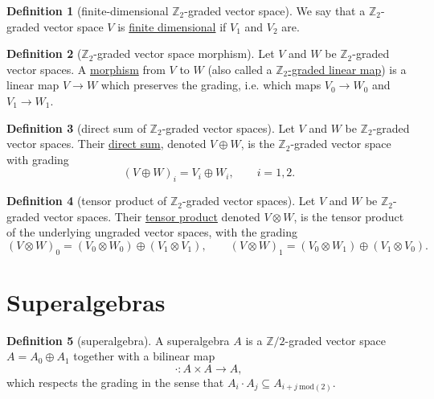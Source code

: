 \documentclass[a4paper,10pt]{scrreprt}
\newcommand{\Z}{\mathbb{Z}}
\newcommand{\defn}[1]{\ul{#1}}
\theoremstyle{definition}
\newtheorem{definition}{Definition}[section]
\theoremstyle{plain}
\theoremstyle{remark}
\begin{document}
\begin{definition}[finite-dimensional $\Z_{2}$-graded vector space]
  \label{def:finitedimensionalz2gradedvectorspace}
  We say that a $\Z_{2}$-graded vector space $V$ is \defn{finite dimensional} if $V_{1}$ and $V_{2}$ are.
\end{definition}

\begin{definition}[$\Z_{2}$-graded vector space morphism]
  \label{def:z2gradedvectorspacemorphism}
  Let $V$ and $W$ be $\Z_{2}$-graded vector spaces. A \defn{morphism} from $V$ to $W$ (also called a \defn{$\Z_{2}$-graded linear map}) is a linear map $V \to W$ which preserves the grading, i.e. which maps $V_{0} \to W_{0}$ and $V_{1} \to W_{1}$.
\end{definition}

\begin{definition}[direct sum of $\Z_{2}$-graded vector spaces]
  \label{def:directsumofz2gradedvectorspaces}
  Let $V$ and $W$ be $\Z_{2}$-graded vector spaces. Their \defn{direct sum}, denoted $V \oplus W$, is the $\Z_{2}$-graded vector space with grading
  \begin{equation*}
    (V \oplus W)_{i} = V_{i} \oplus W_{i},\qquad i = 1, 2.
  \end{equation*}
\end{definition} 
\begin{definition}[tensor product of $\Z_{2}$-graded vector spaces]
  \label{def:tensorproduttofz2gradedvectorspaces}
  Let $V$ and $W$ be $\Z_{2}$-graded vector spaces. Their \defn{tensor product} denoted $V \otimes W$, is the tensor product of the underlying ungraded vector spaces, with the grading
  \begin{equation*}
    (V \otimes W)_{0} = (V_{0} \otimes W_{0})\oplus(V_{1} \otimes V_{1}),\qquad (V \otimes W)_{1} = (V_{0} \otimes W_{1})\oplus(V_{1} \otimes V_{0}).
  \end{equation*}
\end{definition}

\section{Superalgebras}

\begin{definition}[superalgebra]
  \label{def:superalgebra}
  A superalgebra $A$ is a $\Z/2$-graded vector space $A = A_{0} \oplus A_{1}$ together with a bilinear map
  \begin{equation*}
    \cdot\colon A \times A \to A,
  \end{equation*}
  which respects the grading in the sense that $A_{i} \cdot A_{j} \subseteq A_{i+j\ \mathrm{mod}(2)}$.
\end{definition}
\end{document}
